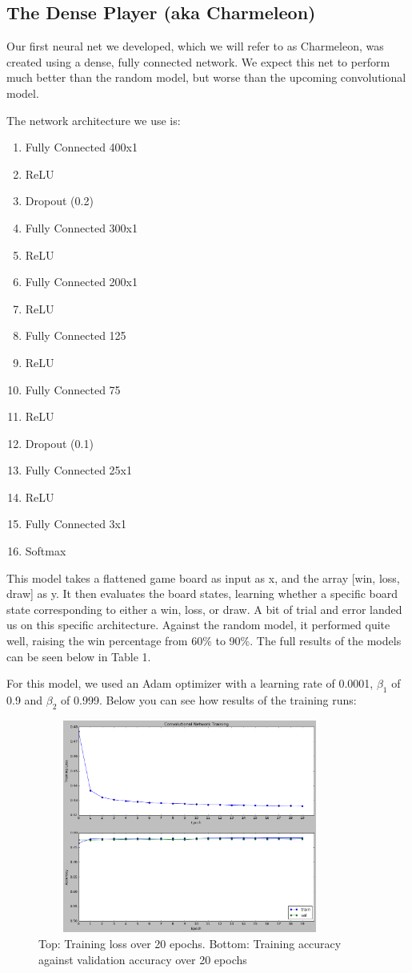 
\subsection{The Dense Player (aka Charmeleon)}

Our first neural net we developed, which we will refer to as Charmeleon, was created using a dense, fully connected network. We expect this net to perform much better than the random model, but worse than the upcoming convolutional model.

The network architecture we use is:
\begin{enumerate}
	\item Fully Connected 400x1
	\item ReLU
	\item Dropout (0.2)
	\item Fully Connected 300x1
	\item ReLU
	\item Fully Connected 200x1
	\item ReLU
	\item Fully Connected 125
	\item ReLU
	\item Fully Connected 75
	\item ReLU
	\item Dropout (0.1)
	\item Fully Connected 25x1
	\item ReLU
	\item Fully Connected 3x1
	\item Softmax
\end{enumerate}
This model takes a flattened game board as input as x, and the array [win, loss, draw] as y. It then evaluates the board states, learning whether a specific board state corresponding to either a win, loss, or draw. A bit of trial and error landed us on this specific architecture. Against the random model, it performed quite well, raising the win percentage from 60\% to 90\%. The full results of the models can be seen below in Table 1. 

For this model, we used an Adam optimizer with a learning rate of 0.0001, $\beta_1$ of 0.9 and $\beta_2$ of 0.999. Below you can see how results of the training runs:

\begin{figure}[h!]
	\centering
	\includegraphics[width=10cm, height=7cm]{convolutional-net-training.png}
	\caption{Top: Training loss over 20 epochs. Bottom: Training accuracy against validation accuracy over 20 epochs}
	\label{fig:conv_net}
\end{figure}
